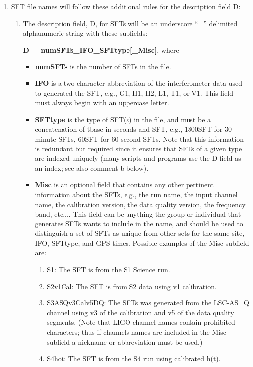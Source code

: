 \documentclass{ligodcc}
\begin{document}
\begin{enumerate}
\item SFT file names will follow these additional rules for the description
field D:

\begin{enumerate}
\item The description field, D, for SFTs will be an underscore ``\_''
delimited alphanumeric string with these subfields:

{\bf D = numSFTs\_IFO\_SFTtype[\_Misc]}, where
\begin{itemize}
\item {\bf numSFTs} is the number of SFTs in the file.

\item {\bf IFO} is a two character abbreviation of the interferometer data used to
generated the SFT, e.g., G1, H1, H2, L1, T1, or V1.  This field must
always begin with an uppercase letter.

\item {\bf SFTtype} is the type of SFT(s) in the file, and must be a concatenation
of tbase in seconds and SFT, e.g., 1800SFT for 30 minute SFTs, 60SFT for 60
second SFTs.  Note that this information is redundant but required since
it ensures that SFTs of a given type are indexed uniquely (many scripts
and programs use the D field as an index; see also comment b below).

\item {\bf Misc} is an optional field that contains any other pertinent information
about the SFTs, e.g., the run name, the input channel name, the
calibration version, the data quality version, the frequency band,
etc.... This field can be anything the group or individual that
generates SFTs wants to include in the name, and should be used to
distinguish a set of SFTs as unique from other sets for the same site,
IFO, SFTtype, and GPS times. Possible examples of the Misc subfield are:
\begin{enumerate}
\item S1: The SFT is from the S1 Science run.
\item S2v1Cal: The SFT is from S2 data using v1 calibration.
\item  S3ASQv3Calv5DQ: The SFTs was generated from the LSC-AS\_Q channel
  using v3 of the calibration and v5 of the data quality segments.  (Note
  that LIGO channel names contain prohibited characters; thus if channels
  names are included in the Misc subfield a nickname or abbreviation must
  be used.)
\item S4hot: The SFT is from the S4 run using calibrated h(t).
\end{enumerate}
\end{itemize}


\end{enumerate}
\end{enumerate}
\end{document}
